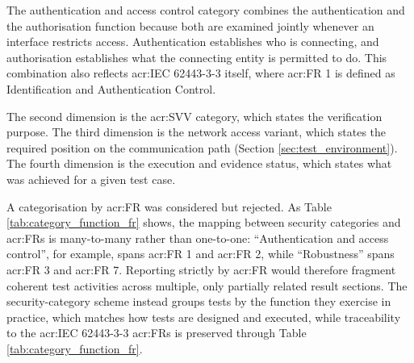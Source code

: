 The authentication and access control category combines the authentication and the authorisation function because both are examined jointly whenever an interface restricts access. Authentication establishes who is connecting, and authorisation establishes what the connecting entity is permitted to do. This combination also reflects \gls{acr:IEC} 62443-3-3 itself, where \gls{acr:FR} 1 is defined as Identification and Authentication Control. 

The second dimension is the \gls{acr:SVV} category, which states the verification purpose. 
The third dimension is the network access variant, which states the required position on the communication path (Section \ref{sec:test_environment}). 
The fourth dimension is the execution and evidence status, which states what was achieved for a given test case. 

A categorisation by \gls{acr:FR} was considered but rejected. As Table \ref{tab:category_function_fr} shows, the mapping between security categories and \glspl{acr:FR} is many-to-many rather than one-to-one: ``Authentication and access control'', for example, spans \gls{acr:FR} 1 and \gls{acr:FR} 2, while ``Robustness'' spans \gls{acr:FR} 3 and \gls{acr:FR} 7. Reporting strictly by \gls{acr:FR} would therefore fragment coherent test activities across multiple, only partially related result sections. The security-category scheme instead groups tests by the function they exercise in practice, which matches how tests are designed and executed, while traceability to the \gls{acr:IEC} 62443-3-3 \glspl{acr:FR} is preserved through Table \ref{tab:category_function_fr}. 


